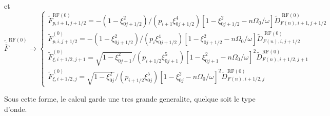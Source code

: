  et \[
\widetilde{\overline{\overline{F}}}^{\text{RF}(0)}\rightarrow\left\{ \begin{array}{l}
\widetilde{F}_{p,i+1,j+1/2}^{\text{RF}(0)}=-\left(1-\xi_{0j+1/2}^{2}\right)/\left(p_{i+1}\xi_{0j+1/2}^{4}\right)\left[1-\xi_{0j+1/2}^{2}-n\Omega_{0}/\omega\right]\widetilde{D}_{F(n),i+1,j+1/2}^{\text{ RF}(0)}\\
\widetilde{F}_{p,i,j+1/2}^{\left(0\right)}=-\left(1-\xi_{0j+1/2}^{2}\right)/\left(p_{i}\xi_{0j+1/2}^{4}\right)\left[1-\xi_{0j+1/2}^{2}-n\Omega_{0}/\omega\right]\widetilde{D}_{F(n),i,j+1/2}^{\text{ RF}(0)}\\
\widetilde{F}_{\xi,i+1/2,j+1}^{\left(0\right)}=\sqrt{1-\xi_{0j+1}^{2}}/\left(p_{i+1/2}\xi_{0j+1}^{5}\right)\left[1-\xi_{0j+1}^{2}-n\Omega_{0}/\omega\right]^{2}\widetilde{D}_{F(n),i+1/2,j+1}^{\text{RF}(0)}\\
\widetilde{F}_{\xi,i+1/2,j}^{\left(0\right)}=\sqrt{1-\xi_{0j}^{2}}/\left(p_{i+1/2}\xi_{0j}^{5}\right)\left[1-\xi_{0j}^{2}-n\Omega_{0}/\omega\right]^{2}\widetilde{D}_{F(n),i+1/2,j}^{\text{RF}(0)}\end{array}\right.\]


Sous cette forme, le calcul garde une tres grande generalite, quelque
soit le type d'onde.
